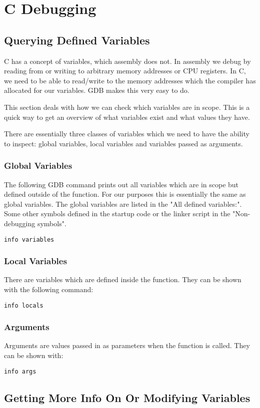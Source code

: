\chapter{C Debugging}
\section{Querying Defined Variables}
C has a concept of variables, which assembly does not. In assembly we debug by reading from or writing to arbitrary memory addresses or CPU registers.  In C, we need to be able to read/write to the memory addresses which the compiler has allocated for our variables. GDB makes this very easy to do. 

This section deals with how we can check which variables are in scope. This is a quick way to get an overview of what variables exist and what values they have. 

There are essentially three classes of variables which we need to have the ability to inspect: global variables, local variables and variables passed as arguments.

\subsection{Global Variables}
The following GDB command prints out all variables which are in scope but defined outside of the function. For our purposes this is essentially the same as global variables. The global variables are listed in the "All defined variables:". Some other symbols defined in the startup code or the linker script in the "Non-debugging symbols".

\texttt{info variables}

\subsection{Local Variables}
There are variables which are defined inside the function. 
They can be shown with the following command:

\texttt{info locals}

\subsection{Arguments}
Arguments are values passed in as parameters when the function is called. They can be shown with:

\texttt{info args}

\section{Getting More Info On Or Modifying Variables}
